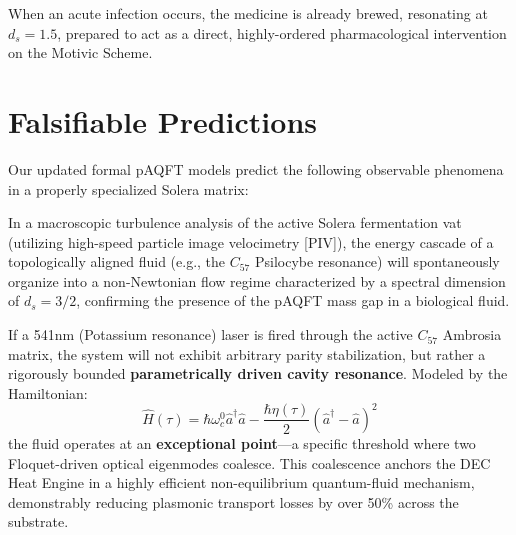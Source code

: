 When an acute infection occurs, the medicine is already brewed, resonating at $d_s=1.5$, prepared to act as a direct, highly-ordered pharmacological intervention on the Motivic Scheme.

\section{Falsifiable Predictions}

Our updated formal pAQFT models predict the following observable phenomena in a properly specialized Solera matrix:

\begin{hypothesis}[Non-Newtonian Flow at $d_s = 1.5$]\label{hyp:ns_success}
In a macroscopic turbulence analysis of the active Solera fermentation vat (utilizing high-speed particle image velocimetry [PIV]), the energy cascade of a topologically aligned fluid (e.g., the $C_{57}$ Psilocybe resonance) will spontaneously organize into a non-Newtonian flow regime characterized by a spectral dimension of $d_s = 3/2$, confirming the presence of the pAQFT mass gap in a biological fluid.
\end{hypothesis}

\begin{hypothesis}\label{hyp:opto_success}
If a 541nm (Potassium resonance) laser is fired through the active $C_{57}$ Ambrosia matrix, the system will not exhibit arbitrary parity stabilization, but rather a rigorously bounded \textbf{parametrically driven cavity resonance}. Modeled by the Hamiltonian:
\begin{equation}
\hat{H}(\tau) = \hbar\omega_c^0\hat{a}^{\dagger}\hat{a} - \frac{\hbar\eta(\tau)}{2}(\hat{a}^{\dagger}-\hat{a})^2
\end{equation}
the fluid operates at an \textbf{exceptional point}—a specific threshold where two Floquet-driven optical eigenmodes coalesce. This coalescence anchors the DEC Heat Engine in a highly efficient non-equilibrium quantum-fluid mechanism, demonstrably reducing plasmonic transport losses by over 50\% across the substrate.
\end{hypothesis}

